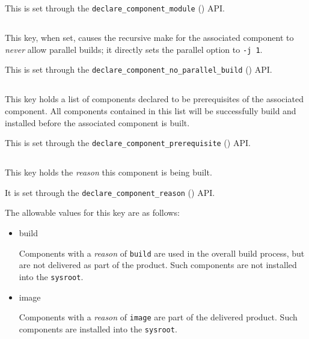 This is set through the \texttt{declare\_component\_module}
() API.

\subsection{}

This key, when set, causes the recursive make for the associated
component to \emph{never} allow parallel builds; it directly sets the
\gnumake parallel option to \texttt{-j 1}.

This is set through the
\texttt{declare\_component\_no\_parallel\_build}
() API.


\subsection{}

This key holds a list of components declared to be prerequisites of
the associated component.  All components contained in this list will
be successfully build and installed before the associated component is
built.

This is set through the \texttt{declare\_component\_prerequisite}
() API.

\subsection{}

This key holds the \emph{reason} this component is being built.

It is set through the \texttt{declare\_component\_reason}
() API.

The allowable values for this key are as follows:

\begin{itemize}
\item build

  Components with a \emph{reason} of \texttt{build} are used in the
  overall build process, but are not delivered as part of the product.
  Such components are not installed into the \texttt{sysroot}.

\item image

  Components with a \emph{reason} of \texttt{image} are part of the
  delivered product.  Such components are installed into the
  \texttt{sysroot}.

\end{itemize}
